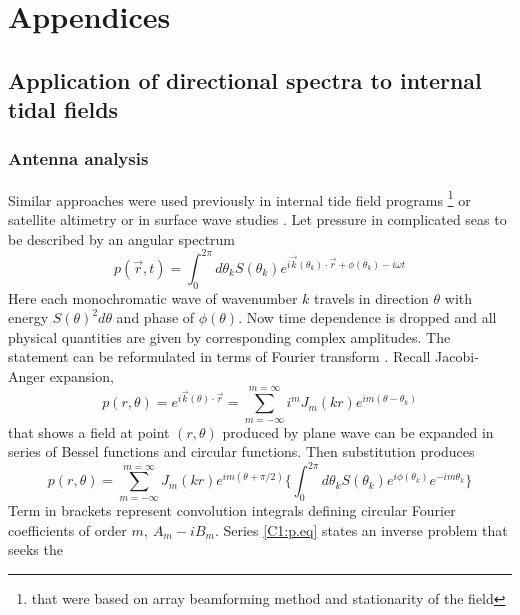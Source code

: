 \documentclass[12pt]{article}
\begin{document}
\section*{Appendices}

\renewcommand{\thesubsection}{\Alph{subsection}}
\setcounter{subsection}{0}
\subsection{Application of directional spectra to internal tidal fields}
\subsubsection{Antenna analysis}
\label{C3.app:A1}
Similar approaches were used previously in internal tide field programs 
\citep{hendry1977observations, lozovatsky2003spatial} \footnote{that were based on array 
beamforming method and stationarity of the field} or satellite altimetry \citep{dushaw2002mapping} 
or in surface wave studies \citep{longuet1961observations, munk1963directional, long1986inverse}. 
Let pressure in complicated seas to be described by an angular spectrum
\begin{equation}
\label{C1:eq.spectrum}
p(\vec{r}, t) = \int_0^{2\pi}  d\theta_k S(\theta_k) e^{i \vec{k}(\theta_k) \cdot \vec{r} + 
	\phi(\theta_k) - i \omega t}
\end{equation}
Here each monochromatic wave of wavenumber $k$ travels in direction $\theta$ with 
energy $S(\theta)^2 d\theta$ and phase of $\phi(\theta)$. Now time dependence is dropped and all 
physical quantities are given by corresponding complex amplitudes. The statement can be 
reformulated in terms of Fourier transform \citep{munk1963directional}. Recall Jacobi-Anger 
expansion,
\begin{equation}
p(r, \theta) = e^{i \vec{k}(\theta) \cdot \vec{r}} = \sum_{m = -\infty}^{m = \infty} i^{m} J_{m}(k 
r) e^{im(\theta - \theta_k)}
\end{equation}
that shows a field at point $(r, \theta)$ produced by plane wave can be expanded in series of 
Bessel functions and circular functions. Then substitution produces
\begin{equation}
\label{C1:p.eq}
p(r, \theta) = \sum_{m=-\infty}^{m=\infty} J_m(kr) e^{im(\theta + \pi/2)} \Big\{ \int_0^{2\pi}  
d\theta_k 
S(\theta_k) 
e^{i\phi(\theta_k)} e^{-im\theta_k} \Big\}
\end{equation}
Term in brackets represent convolution integrals defining circular Fourier coefficients of 
order $m,~A_m - i B_m$. Series \eqref{C1:p.eq} states an inverse problem that seeks the 
\end{document}
